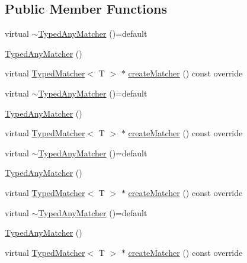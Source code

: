 \subsection*{Public Member Functions}
\begin{DoxyCompactItemize}
\item 
virtual \mbox{\hyperlink{structfakeit_1_1internal_1_1TypedAnyMatcher_a52af9fb206f668d7cfe238758132a531}{$\sim$\+Typed\+Any\+Matcher}} ()=default
\item 
\mbox{\hyperlink{structfakeit_1_1internal_1_1TypedAnyMatcher_a8b569fe8bfe34ad8e9a893ebc13cea52}{Typed\+Any\+Matcher}} ()
\item 
virtual \mbox{\hyperlink{structfakeit_1_1TypedMatcher}{Typed\+Matcher}}$<$ T $>$ $\ast$ \mbox{\hyperlink{structfakeit_1_1internal_1_1TypedAnyMatcher_a4306295a5059d27896ccb3370275c4ce}{create\+Matcher}} () const override
\item 
virtual \mbox{\hyperlink{structfakeit_1_1internal_1_1TypedAnyMatcher_a52af9fb206f668d7cfe238758132a531}{$\sim$\+Typed\+Any\+Matcher}} ()=default
\item 
\mbox{\hyperlink{structfakeit_1_1internal_1_1TypedAnyMatcher_a8b569fe8bfe34ad8e9a893ebc13cea52}{Typed\+Any\+Matcher}} ()
\item 
virtual \mbox{\hyperlink{structfakeit_1_1TypedMatcher}{Typed\+Matcher}}$<$ T $>$ $\ast$ \mbox{\hyperlink{structfakeit_1_1internal_1_1TypedAnyMatcher_a4306295a5059d27896ccb3370275c4ce}{create\+Matcher}} () const override
\item 
virtual \mbox{\hyperlink{structfakeit_1_1internal_1_1TypedAnyMatcher_a52af9fb206f668d7cfe238758132a531}{$\sim$\+Typed\+Any\+Matcher}} ()=default
\item 
\mbox{\hyperlink{structfakeit_1_1internal_1_1TypedAnyMatcher_a8b569fe8bfe34ad8e9a893ebc13cea52}{Typed\+Any\+Matcher}} ()
\item 
virtual \mbox{\hyperlink{structfakeit_1_1TypedMatcher}{Typed\+Matcher}}$<$ T $>$ $\ast$ \mbox{\hyperlink{structfakeit_1_1internal_1_1TypedAnyMatcher_a4306295a5059d27896ccb3370275c4ce}{create\+Matcher}} () const override
\item 
virtual \mbox{\hyperlink{structfakeit_1_1internal_1_1TypedAnyMatcher_a52af9fb206f668d7cfe238758132a531}{$\sim$\+Typed\+Any\+Matcher}} ()=default
\item 
\mbox{\hyperlink{structfakeit_1_1internal_1_1TypedAnyMatcher_a8b569fe8bfe34ad8e9a893ebc13cea52}{Typed\+Any\+Matcher}} ()
\item 
virtual \mbox{\hyperlink{structfakeit_1_1TypedMatcher}{Typed\+Matcher}}$<$ T $>$ $\ast$ \mbox{\hyperlink{structfakeit_1_1internal_1_1TypedAnyMatcher_a4306295a5059d27896ccb3370275c4ce}{create\+Matcher}} () const override

\end{DoxyCompactItemize}
